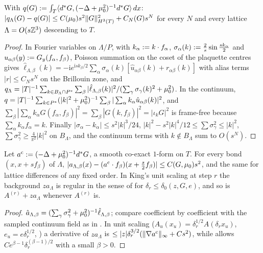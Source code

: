 \begin{lemma}\label{rot:lem:q}
With $q(G):=\int_T\langle d^{*} G,(-\Delta+\mu_0^2)^{-1}d^{*} G\rangle\,dx$: $|q_\Lambda(G)-q(G)|\le C(\mu_0)s^2\|G\|_{H^3(T)}^2+C_N(G)s^N$ for every $N$ and every lattice $\Lambda=O(s\mathbb Z^3)$ descending to $T$.
\end{lemma}
\begin{proof}
In Fourier variables on $\Lambda/P$, with $k_\alpha:= k\cdot f_\alpha$, $\sigma_\alpha(k):=\frac2s\sin\frac{sk_\alpha}2$ and $u_{\alpha\beta}(y):= G_y(f_\alpha,f_\beta)$, Poisson summation on the coset of the plaquette centres gives $\hat\ell_{\Lambda,\beta}(k)=-\mathrm ie^{\mathrm isk_\beta/2}\sum_\alpha\sigma_\alpha(k)[\hat u_{\alpha\beta}(k)+r_{\alpha\beta}(k)]$ with alias terms $|r|\le C_Ns^N$ on the Brillouin zone, and $q_\Lambda=|T|^{-1}\sum_{k\in B_\Lambda\cap P^*}\sum_\beta|\hat\ell_{\Lambda,\beta}(k)|^2/(\sum_\gamma\sigma_\gamma(k)^2+\mu_0^2)$. In the continuum, $q=|T|^{-1}\sum_{k\in P^*}(|k|^2+\mu_0^2)^{-1}\sum_\beta|\sum_\alpha k_\alpha\hat u_{\alpha\beta}(k)|^2$, and $\sum_\beta|\sum_\alpha k_\alpha G(f_\alpha,f_\beta)|^2=\sum_\beta|G(k,f_\beta)|^2=|\iota_kG|^2$ is frame-free because $\sum_\alpha k_\alpha f_\alpha=k$. Finally $|\sigma_\alpha-k_\alpha|\le s^2|k|^3/24$, $|k|^2-s^2|k|^4/12\le\sum\sigma_\gamma^2\le|k|^2$, $\sum\sigma_\gamma^2\ge\frac4{\pi^2}|k|^2$ on $B_\Lambda$, and the continuum terms with $k\notin B_\Lambda$ sum to $O(s^N)$.
\end{proof}

\begin{lemma}\label{rot:lem:shift}
Let $a^{\rm c}:=(-\Delta+\mu_0^2)^{-1}d^{*} G$, a smooth co-exact $1$-form on $T$. For every bond $(x,x+sf_\beta)$ of $\Lambda$, $|a_{\Lambda,\beta}(x)-(a^{\rm c}\cdot f_\beta)(x+\frac s2f_\beta)|\le C(G,\mu_0)s^2$, and the same for lattice differences of any fixed order. In King's unit scaling at step $r$ the background $za_\Lambda$ is regular in the sense of \cite[Def.~3.2]{K1} for $\delta_r\le\delta_0(z,G,e)$, and so is $A^{(r)}+za_\Lambda$ whenever $A^{(r)}$ is.
\end{lemma}
\begin{proof}
$\hat a_{\Lambda,\beta}=(\sum_\gamma\sigma_\gamma^2+\mu_0^2)^{-1}\hat\ell_{\Lambda,\beta}$; compare coefficient by coefficient with the sampled continuum field as in . In unit scaling ($A_u(x_u)=\delta_r^{1/2}A(\delta_rx_u)$, $e_u=e\delta_r^{1/2}$, \cite[(2.20)]{K1}) a derivative of $za_\Lambda$ is $\le|z|\delta_r^{3/2}(\|\nabla a^{\rm c}\|_\infty+Cs^2)$, while \cite[Def.~3.2]{K1} allows $Ce^{\beta-1}\delta_r^{(\beta-1)/2}$ with a small $\beta>0$.
\end{proof}

